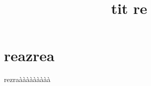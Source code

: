 \documentclass{article}
\title{tit re}
\begin{document}
\maketitle
\section{reazrea}{rezraààààààààà}
\end{document}
